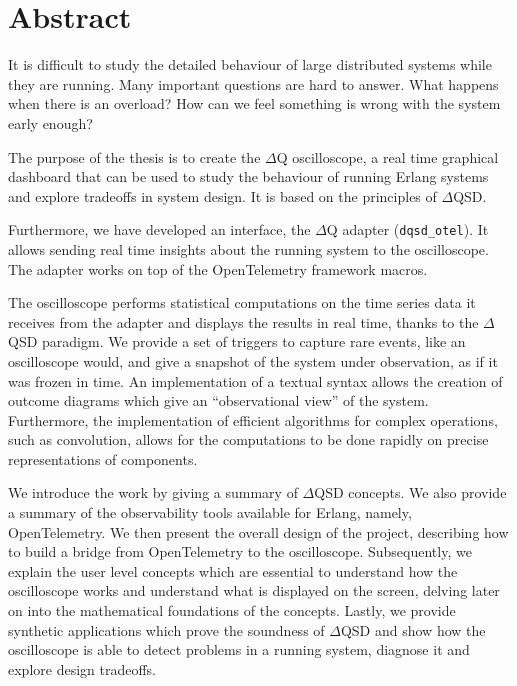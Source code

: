 \chapter*{Abstract}
    It is difficult to study the detailed behaviour of large distributed systems while they are running. Many important questions are hard to answer. What happens when there is an overload? How can we feel something is wrong with the system early enough?

    The purpose of the thesis is to create the $\Delta$Q oscilloscope, a real time graphical dashboard that can be used to study the behaviour of running Erlang systems and explore tradeoffs in system design. It is based on the principles of $\Delta$QSD.
  
    Furthermore, we have developed an interface, the $\Delta$Q adapter (\texttt{dqsd\_otel}). It allows sending real time insights about the running system to the oscilloscope. The adapter works on top of the OpenTelemetry framework macros.
    
    The oscilloscope performs statistical computations on the time series data it receives from the adapter and displays the results in real time, thanks to the $\Delta$QSD paradigm. We provide a set of triggers to capture rare events, like an oscilloscope would, and give a snapshot of the system under observation, as if it was frozen in time. An implementation of a textual syntax allows the creation of outcome diagrams which give an ``observational view'' of the system. Furthermore, the implementation of efficient algorithms for complex operations, such as convolution, allows for the computations to be done rapidly on precise representations of components.

    We introduce the work by giving a summary of $\Delta$QSD concepts. We also provide a summary of the observability tools available for Erlang, namely, OpenTelemetry. We then present the overall design of the project, describing how to build a bridge from OpenTelemetry to the oscilloscope. Subsequently, we explain the user level concepts which are essential to understand how the oscilloscope works and understand what is displayed on the screen, delving later on into the mathematical foundations of the concepts. Lastly, we provide synthetic applications which prove the soundness of $\Delta$QSD and show how the oscilloscope is able to detect problems in a running system, diagnose it and explore design tradeoffs.



